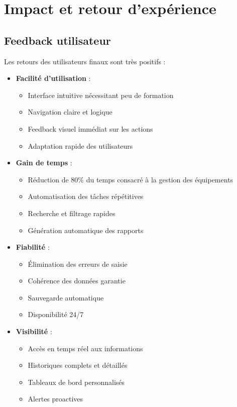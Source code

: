 \documentclass[12pt,a4paper]{report}
\begin{document}
\section{Impact et retour d'expérience}

\subsection{Feedback utilisateur}
Les retours des utilisateurs finaux sont très positifs :

\begin{itemize}

\item \textbf{Facilité d'utilisation} : 
  \begin{itemize}
  \item Interface intuitive nécessitant peu de formation
  \item Navigation claire et logique
  \item Feedback visuel immédiat sur les actions
  \item Adaptation rapide des utilisateurs
  \end{itemize}

\item \textbf{Gain de temps} : 
  \begin{itemize}
  \item Réduction de 80\% du temps consacré à la gestion des équipements
  \item Automatisation des tâches répétitives
  \item Recherche et filtrage rapides
  \item Génération automatique des rapports
  \end{itemize}

\item \textbf{Fiabilité} : 
  \begin{itemize}
  \item Élimination des erreurs de saisie
  \item Cohérence des données garantie
  \item Sauvegarde automatique
  \item Disponibilité 24/7
  \end{itemize}

\item \textbf{Visibilité} : 
  \begin{itemize}
  \item Accès en temps réel aux informations
  \item Historiques complets et détaillés
  \item Tableaux de bord personnalisés
  \item Alertes proactives
  \end{itemize}
\end{itemize}
\end{document}
